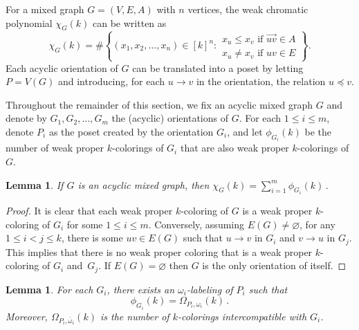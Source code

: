 \documentclass[11pt]{amsart}
\newtheorem{lemma}[theorem]{Lemma}
\renewcommand\emptyset{\varnothing}
\begin{document}
For a mixed graph $G=(V,E,A)$ with $n$ vertices, the weak chromatic polynomial $\chi _G(k)$ can be written as 
\[
  \chi _G(k) = \# \left\{ (x_1, x_2, \dots, x_n) \in [k]^n :
  \begin{array}{l}
    x_u \leq x_v \text{ if } \vec{uv} \in A \\
    x_u \ne x_v \text{ if } uv \in E
  \end{array} \right\} .
\]
Each acyclic orientation of $G$ can be translated into a poset by letting $P = V(G)$ and introducing, for each $u \to v$ in the orientation, the relation $u \preceq v$. 

Throughout the remainder of this section, we fix an acyclic mixed graph $G$ and denote by $G_1, G_2, \ldots, G_m$ the (acyclic) orientations of $G$. For each $1 \le i \le m$, denote $P_i$ as the poset created by the orientation $G_i$, and
let $\phi_{G_i}(k)$ be the number of weak proper $k$-colorings of $G_i$ that are also weak proper $k$-colorings of $G$.

\begin{lemma}\label{phisum}
If $G$ is an acyclic mixed graph, then $\chi_G(k) = \displaystyle\sum_{i=1}^m \phi_{G_i}(k) \, .$
\end{lemma}

\begin{proof}
It is clear that each weak proper $k$-coloring of $G$ is a weak proper $k$-coloring of $G_i$ for some $1 \le i \le m$.
Conversely, assuming $E(G) \ne \emptyset$, for any $1 \le i < j \le k$, there is some $uv \in E(G)$ such that $u
\to v$ in $G_i$ and $v \to u$ in $G_j$. This implies that there is no weak proper coloring that is a weak proper $k$-coloring of $G_i$ and~$G_j$.
If $E(G) = \emptyset$ then $G$ is the only orientation of itself.
\end{proof}

\begin{lemma}\label{labeling}
For each $G_i$, there exists an $\omega_i$-labeling of $P_i$ such that $$\phi_{G_i}(k) = \Omega_{P_i,\omega_i}(k) \, .$$ Moreover, $\Omega_{P_i,\overline{\omega}_i}(k)$ is the number of $k$-colorings intercompatible with $G_i$.
\end{lemma}
\end{document}
